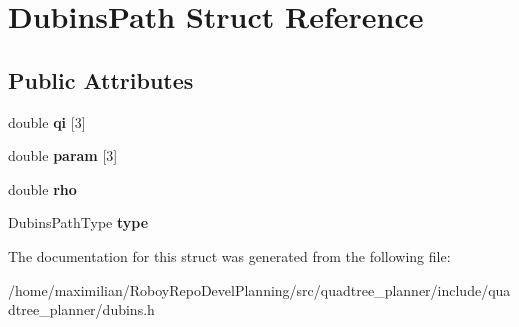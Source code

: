 \hypertarget{structDubinsPath}{}\section{Dubins\+Path Struct Reference}
\label{structDubinsPath}
\subsection*{Public Attributes}
\begin{DoxyCompactItemize}
\item 
\mbox{\label{structDubinsPath_aabcbfbb58406794577c58b00f6109263}} 
double {\bfseries qi} \mbox{[}3\mbox{]}
\item 
\mbox{\label{structDubinsPath_a0e88cf654931b652566e497a156e0c91}} 
double {\bfseries param} \mbox{[}3\mbox{]}
\item 
\mbox{\label{structDubinsPath_a7731666554b2a029e60717f26a8defb8}} 
double {\bfseries rho}
\item 
\mbox{\label{structDubinsPath_af1de248d28f35c6784a8f9a3c99db25b}} 
Dubins\+Path\+Type {\bfseries type}
\end{DoxyCompactItemize}


The documentation for this struct was generated from the following file\+:\begin{DoxyCompactItemize}
\item 
/home/maximilian/\+Roboy\+Repo\+Devel\+Planning/src/quadtree\+\_\+planner/include/quadtree\+\_\+planner/dubins.\+h\end{DoxyCompactItemize}
